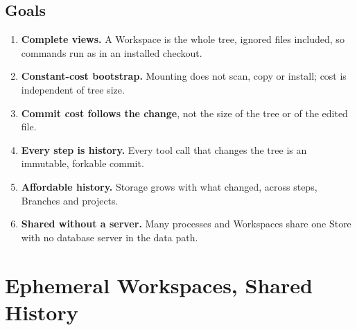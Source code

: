 \documentclass[letterpaper,twocolumn,10pt]{article}
\newcommand{\ws}{Workspace}
\begin{document}
\subsection{Goals}

\begin{enumerate}
\item \textbf{Complete views.} A \ws{} is the whole tree, ignored files
  included, so commands run as in an installed checkout.
\item \textbf{Constant-cost bootstrap.} Mounting does not scan, copy or
  install; cost is independent of tree size.
\item \textbf{Commit cost follows the change}, not the size of the tree or
  of the edited file.
\item \textbf{Every step is history.} Every tool call that changes the tree
  is an immutable, forkable commit.
\item \textbf{Affordable history.} Storage grows with what changed, across
  steps, Branches and projects.
\item \textbf{Shared without a server.} Many processes and \ws{}s share one
  Store with no database server in the data path.
\end{enumerate}

\section{Ephemeral Workspaces, Shared History}
\label{sec:design}
\end{document}

